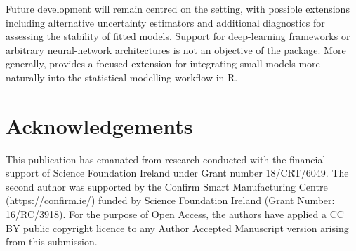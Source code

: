 Future development will remain centred on the  setting, with possible extensions including alternative uncertainty estimators and additional diagnostics for assessing the stability of fitted models.
Support for deep-learning frameworks or arbitrary neural-network architectures is not an objective of the package.
More generally,  provides a focused extension for integrating small  models more naturally into the statistical modelling workflow in R.

\section{Acknowledgements}\label{acknowledgements}

This publication has emanated from research conducted with the financial support of Science Foundation Ireland under Grant number 18/CRT/6049.
The second author was supported by the Confirm Smart Manufacturing Centre (\url{https://confirm.ie/}) funded by Science Foundation Ireland (Grant Number: 16/RC/3918).
For the purpose of Open Access, the authors have applied a CC BY public copyright licence to any Author Accepted Manuscript version arising from this submission.



\address{%
Andrew McInerney\\
University of Limerick\\%
Department of Mathematics and Statistics\\ Limerick, Ireland\\
%
%
\textit{ORCiD: \href{https://orcid.org/0000-0002-2348-2159}{0000-0002-2348-2159}}\\%
\href{mailto:andrew.mcinerney@ul.ie}{\nolinkurl{andrew.mcinerney@ul.ie}}%
}

\address{%
Kevin Burke\\
University of Limerick\\%
Department of Mathematics and Statistics\\ Limerick, Ireland\\
%
%
%
\href{mailto:kevin.burke@ul.ie}{\nolinkurl{kevin.burke@ul.ie}}%
}
